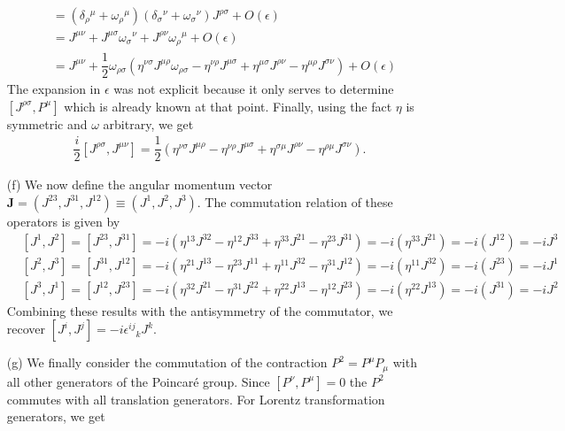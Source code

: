 \documentclass[10pt, a4paper]{article}
\begin{document}
\begin{enumerate}
\begin{align*}
      &= (\delta_\rho{ }^\mu + \omega_\rho{ }^\mu)(\delta_\sigma{ }^\nu+\omega_\sigma{ }^\nu) J^{\rho \sigma} + O(\epsilon)\\
      &= J^{\mu \nu} + J^{\mu \sigma} \omega_\sigma{ }^\nu + J^{\rho \nu}\omega_\rho{ }^\mu + O(\epsilon)\\
      &= J^{\mu \nu} + \dfrac{1}{2} \omega_{\rho\sigma} \left(\eta^{\nu \sigma}J^{\mu \rho} \omega_{\rho\sigma} -\eta^{\nu \rho}J^{\mu \sigma} + \eta^{\mu \sigma} J^{\rho \nu} - \eta^{\mu \rho} J^{\sigma \nu}\right) + O(\epsilon)
    \end{align*}
    The expansion in $\epsilon$ was not explicit because it only serves to determine $[J^{\rho \sigma}, P^{\mu}]$ which is already known at that point. Finally, using the fact $\eta$ is symmetric and $\omega$ arbitrary, we get 
    \begin{align*}
      \dfrac{i}{2} [J^{\rho \sigma}, J^{\mu \nu}] = \dfrac{1}{2} \left(\eta^{\nu \sigma} J^{\mu \rho} -\eta^{\nu \rho} J^{\mu \sigma} + \eta^{\sigma\mu} J^{\rho \nu} - \eta^{\rho\mu} J^{\sigma \nu}\right).
    \end{align*}
  \item[(f)] We now define the angular momentum vector $\mathbf{J} = (J^{23}, J^{31}, J^{12}) \equiv (J^1, J^2, J^3)$.  The commutation relation of these operators is given by
  \begin{align*}
    &[J^1, J^2] = [J^{23}, J^{31}] = -i \left(\eta^{1 3} J^{3 2} -\eta^{1 2} J^{3 3} + \eta^{33} J^{2 1} - \eta^{23} J^{3 1}\right) = -i \left( \eta^{33} J^{2 1}\right) = -i (J^{12}) = -i J^3\\
    &[J^2, J^3] = [J^{31}, J^{12}] =   -i\left(\eta^{2 1} J^{1 3} -\eta^{2 3} J^{1 1} + \eta^{1 1} J^{3 2} - \eta^{3 1} J^{1 2}\right) = -i\left( \eta^{1 1} J^{3 2}\right) = -i\left(J^{2 3}\right) = -i J^{1} \\
    &[J^3, J^1] = [J^{12}, J^{23}] = -i\left(\eta^{3 2} J^{2 1} -\eta^{3 1} J^{2 2} + \eta^{2 2} J^{1 3} - \eta^{1 2} J^{2 3}\right) = -i\left(\eta^{2 2} J^{1 3}\right) = -i\left(J^{3 1}\right) = -iJ^2 
  \end{align*}  
  Combining these results with the antisymmetry of the commutator, we recover $\left[J^i, J^j\right]=-i \epsilon^{i j}{}_{k} J^k$.
  \item[(g)] We finally consider the commutation of the contraction $P^2 = P^{\mu} P_\mu$ with all other generators of the Poincaré group. Since $[P^{\nu}, P^{\mu}] = 0$ the $P^2$ commutes with all translation generators. For Lorentz transformation generators, we get 

\end{enumerate}
\end{document}
